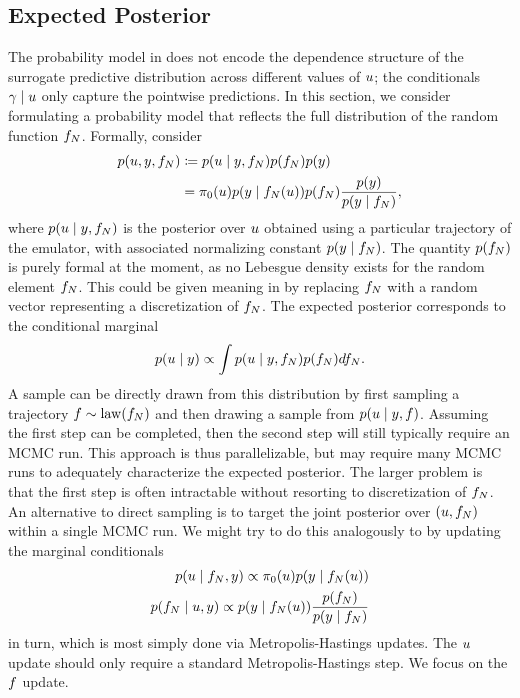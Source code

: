 \documentclass[12pt]{article}
\begin{document}
\subsection{Expected Posterior}
The probability model in  does not encode the dependence structure of the 
surrogate predictive distribution across different values of $u$; the conditionals $\gamma \mid u$
only capture the pointwise predictions. In this section, we consider formulating a probability model that 
reflects the full distribution of the random function $f_{N}$. Formally, consider
\begin{align}
p(u, y, f_{N}) &\coloneqq
p(u \mid y, f_{N}) p(f_{N}) p(y) \\
&= \pi_0(u) p(y \mid f_{N}(u))p(f_{N}) \frac{p(y)}{p(y \mid f_{N})}, \label{eq:EP-prob-model}
\end{align}
where $p(u \mid y, f_{N})$ is the posterior over $u$ obtained using a particular 
trajectory of the emulator, with associated normalizing constant $p(y \mid f_{N})$.
The quantity $p(f_{N})$ is purely formal at the moment, as no Lebesgue 
density exists for the random element $f_{N}$. This could be given meaning in 
by replacing $f_{N}$ with a random vector representing a discretization of $f_{N}$. The expected 
posterior corresponds to the conditional marginal
\begin{align}
p(u \mid y) \propto \int p(u \mid y, f_{N}) p(f_{N}) df_{N}.
\label{eq:EP-marginal}
\end{align}
A sample can be directly drawn from this distribution by first sampling a trajectory $f \sim \mathrm{law}(f_{N})$
and then drawing a sample from $p(u \mid y, f)$. Assuming the first step can be completed, 
then the second step will still typically require an MCMC run. This approach is thus parallelizable, but 
may require many MCMC runs to adequately characterize the expected posterior. The larger problem is 
that the first step is often intractable without resorting to discretization of $f_{N}$. An alternative to direct
sampling is to target the joint posterior over $(u, f_{N})$ within a single MCMC run. We might try to 
do this analogously to  by updating the marginal conditionals 
\begin{align}
p(u \mid f_{N}, y) \propto \pi_0(u) p(y \mid f_{N}(u)) \label{eq:EP-conditionals} \\
p(f_{N} \mid u, y) \propto p(y \mid f_{N}(u)) \frac{p(f_{N})}{p(y \mid f_{N})}
\end{align}
in turn, which is most simply done via Metropolis-Hastings updates.
The $u$ update should only require a standard Metropolis-Hastings step. We focus on the
$f$ update.
\end{document}
